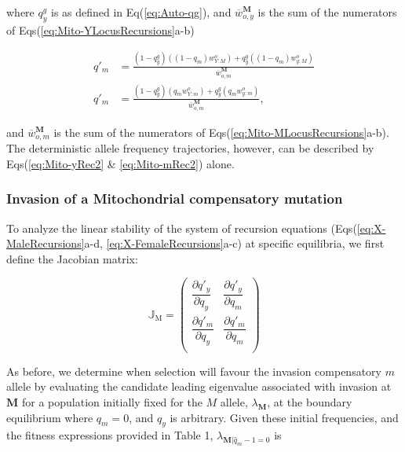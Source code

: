 \documentclass{article}
\begin{document}
\noindent where $q^g_y$ is as defined in Eq(\ref{eq:Auto-qg}), and $\overline{w}^{\mathbf{M}}_{o,y}$ is the sum of the numerators of Eqs(\ref{eq:Mito-YLocusRecursions}a-b)

\begin{subequations}\label{eq:Mito-MLocusRecursions} 
	\begin{align} 
		q'_{m} &= \frac{(1 - q^g_{y}) ((1 - q_m) w^o_{Y:M}) + q^g_y((1 - q_m) w^o_{y:M})} {\overline{w}^{\mathbf{M}}_{o,m}} \label{eq:Mito-MRec1} \\
		q'_{m} &= \frac{(1 - q^g_{y}) (q_m w^o_{Y:m}) + q^g_y(q_m w^o_{y:m})} {\overline{w}^{\mathbf{M}}_{o,m}}, \label{eq:Mito-mRec2}
	\end{align}
\end{subequations}

\noindent and  $\overline{w}^{\mathbf{M}}_{o,m}$ is the sum of the numerators of Eqs(\ref{eq:Mito-MLocusRecursions}a-b). The deterministic allele frequency trajectories, however, can be described by Eqs(\ref{eq:Mito-yRec2} \& \ref{eq:Mito-mRec2}) alone.



\subsubsection{Invasion of a Mitochondrial compensatory mutation}

To analyze the linear stability of the system of recursion equations (Eqs(\ref{eq:X-MaleRecursions}a-d, \ref{eq:X-FemaleRecursions}a-c) at specific equilibria, we first define the Jacobian matrix:

\begin{equation}
	\mathbb{J}_{\text{M}} = \left( \begin{array}{cc} 
		\dfrac{\partial q'_{y}}{\partial q_{y}} & \dfrac{\partial q'_{y}}{\partial q_{m}} \\ 
		\dfrac{\partial q'_{m}}{\partial q_{y}} & \dfrac{\partial q'_{m}}{\partial q_{m}} \\ 
	\end{array} \right)
\end{equation}

\noindent As before, we determine when selection will favour the invasion compensatory $m$ allele by evaluating the candidate leading eigenvalue associated with invasion at $\mathbf{M}$ for a population initially fixed for the $M$ allele, $\lambda_{\mathbf{M}}$, at the boundary equilibrium where $q_m = 0$, and $q_y$ is arbitrary. Given these initial frequencies, and the fitness expressions provided in Table 1, $\lambda_{\mathbf{M}|\hat{q}_m -1 = 0}$ is 
\end{document}
